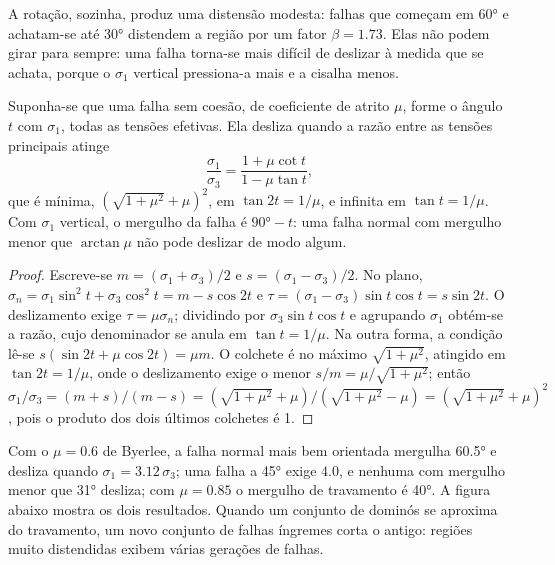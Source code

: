 A rotação, sozinha, produz uma distensão modesta: falhas que começam em \ang{60} e
achatam-se até \ang{30} distendem a região por um fator $\beta = 1.73$. Elas não podem girar
para sempre: uma falha torna-se mais difícil de deslizar à medida que se achata, porque o
$\sigma_1$ vertical pressiona-a mais e a cisalha menos.

\begin{proposition}\label{prop:b3:extension-strike-slip:lockup}
Suponha-se que uma falha sem coesão, de coeficiente de atrito $\mu$, forme o ângulo
$t$ com $\sigma_1$, todas as tensões efetivas. Ela desliza quando a razão entre as
tensões principais atinge
\[
  \frac{\sigma_1}{\sigma_3} = \frac{1 + \mu\cot t}{1 - \mu\tan t} ,
\]
que é mínima, $(\sqrt{1 + \mu^2} + \mu)^2$, em $\tan2t = 1/\mu$, e
infinita em $\tan t = 1/\mu$. Com $\sigma_1$ vertical, o mergulho da falha é
$\ang{90} - t$: uma falha normal com mergulho menor que $\arctan\mu$ não pode deslizar de
modo algum.
\end{proposition}

\begin{proof}
Escreve-se $m = (\sigma_1 + \sigma_3)/2$ e $s = (\sigma_1 - \sigma_3)/2$. No
plano, $\sigma_n = \sigma_1\sin^2t + \sigma_3\cos^2t = m - s\cos2t$ e
$\tau = (\sigma_1 - \sigma_3)\sin t\cos t = s\sin2t$. O deslizamento exige $\tau =
\mu\sigma_n$; dividindo por $\sigma_3\sin t\cos t$ e agrupando $\sigma_1$
obtém-se a razão, cujo denominador se anula em $\tan t = 1/\mu$. Na outra
forma, a condição lê-se $s(\sin2t + \mu\cos2t) = \mu m$. O colchete é no
máximo $\sqrt{1 + \mu^2}$, atingido em $\tan2t = 1/\mu$, onde o deslizamento exige o
menor $s/m = \mu/\sqrt{1 + \mu^2}$; então $\sigma_1/\sigma_3 = (m + s)/(m - s) =
(\sqrt{1 + \mu^2} + \mu)/(\sqrt{1 + \mu^2} - \mu) = (\sqrt{1 + \mu^2} +
\mu)^2$, pois o produto dos dois últimos colchetes é 1.
\end{proof}

Com o $\mu = 0.6$ de Byerlee, a falha normal mais bem orientada mergulha \ang{60.5} e
desliza quando $\sigma_1 = 3.12\,\sigma_3$; uma falha a \ang{45} exige $4.0$, e
nenhuma com mergulho menor que \ang{31} desliza; com $\mu = 0.85$ o mergulho de travamento é
\ang{40}. A figura abaixo mostra os dois resultados. Quando um conjunto de dominós se aproxima
do travamento, um novo conjunto de falhas íngremes corta o antigo: regiões muito distendidas
exibem várias gerações de falhas.

